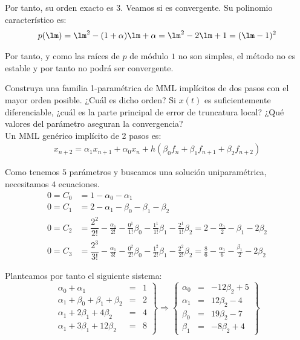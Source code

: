 \begin{ejercicio}
    Por tanto, su orden exacto es $3$. Veamos si es convergente. Su polinomio característico es:
    \begin{align*}
        p(\lm) = \lm^2-(1+\alpha)\lm + \alpha
        = \lm^2-2\lm + 1 = (\lm-1)^2
    \end{align*}

    Por tanto, y como las raíces de $p$ de módulo $1$ no son simples, el método no es estable y por tanto no podrá ser convergente.
\end{ejercicio}

\begin{ejercicio}\label{ej:3.1.13}
    Construya una familia 1-paramétrica de MML implícitos de dos pasos con el mayor orden posible. ¿Cuál es dicho orden? Si $x(t)$ es suficientemente diferenciable, ¿cuál es la parte principal de error de truncatura local? ¿Qué valores del parámetro aseguran la convergencia?\\

    Un MML genérico implícito de 2 pasos es:
    \begin{align*}
        x_{n+2} = \alpha_1x_{n+1} + \alpha_0x_{n} + h\left(\beta_0f_n + \beta_1f_{n+1} + \beta_2f_{n+2}\right)
    \end{align*}

    Como tenemos $5$ parámetros y buscamos una solución uniparamétrica, necesitamos $4$ ecuaciones.
    \begin{align*}
        0 = C_0 &= 1-\alpha_0-\alpha_1\\
        0 = C_1 &= 2-\alpha_1-\beta_0-\beta_1-\beta_2\\
        0 = C_2 &= \dfrac{2^2}{2!} -\frac{\alpha_1}{2!} - \frac{0^1}{1!}\beta_0- \frac{1^1}{1!}\beta_1- \frac{2^1}{1!}\beta_2
        = 2-\frac{\alpha_1}{2}-\beta_1-2\beta_2\\
        0 = C_3 &= \dfrac{2^3}{3!} -\frac{\alpha_1}{3!} - \frac{0^2}{2!}\beta_0- \frac{1^2}{2!}\beta_1- \frac{2^2}{2!}\beta_2
        = \frac{8}{6} - \frac{\alpha_1}{6} - \frac{\beta_1}{2} - 2\beta_2
    \end{align*}

    Planteamos por tanto el siguiente sistema:
    \begin{equation*}
        \left.
            \begin{array}{rcl}
                \alpha_0+\alpha_1 &=& 1\\
                \alpha_1+\beta_0 + \beta_1 + \beta_2 &=& 2\\
                \alpha_1 + 2\beta_1 + 4\beta_2 &=& 4\\
                \alpha_1 + 3\beta_1+12\beta_2 &=& 8
            \end{array}
        \right\}
        \Longrightarrow
        \left\{
            \begin{array}{rcl}
                \alpha_0 &=&-12\beta_2+5\\
                \alpha_1 &=&12\beta_2-4\\
                \beta_0 &=&19\beta_2-7\\
                \beta_1 &=&-8\beta_2+4
            \end{array}
        \right\}
    \end{equation*}


\end{ejercicio}
